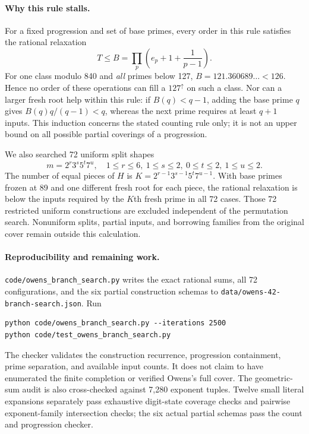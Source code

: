 \documentclass[11pt]{article}
\begin{document}
\paragraph{Why this rule stalls.}
For a fixed progression and set of base primes, every order in this rule
satisfies the rational relaxation
\[
 T\leq B=\prod_{p}\left(e_p+1+\frac1{p-1}\right).
\]
For one class modulo 840 and \emph{all} primes below 127,
$B=121.360689\ldots<126$. Hence no order of these operations can fill
a $127^\uparrow$ on such a class. Nor can a larger fresh root help within
this rule: if $B(q)<q-1$, adding the base prime $q$ gives
$B(q)q/(q-1)<q$, whereas the next prime requires at least $q+1$ inputs.
This induction concerns the stated counting rule only; it is not an upper
bound on all possible partial coverings of a progression.

We also searched 72 uniform split shapes
\[
 m=2^r3^s5^t7^u,\quad
 1\leq r\leq6,\ 1\leq s\leq2,\ 0\leq t\leq2,\ 1\leq u\leq2.
\]
The number of equal pieces of $H$ is
$K=2^{r-1}3^{s-1}5^t7^{u-1}$. With base primes frozen at 89 and one
different fresh root for each piece, the rational relaxation is below
the inputs required by the $K$th fresh prime in all 72 cases.
Those 72 restricted uniform constructions are excluded independent of
the permutation search. Nonuniform splits, partial inputs, and borrowing
families from the original cover remain outside this calculation.

\paragraph{Reproducibility and remaining work.}
\texttt{code/owens\_branch\_search.py} writes the exact rational sums,
all 72 configurations, and the six partial construction schemas to
\texttt{data/owens-42-branch-search.json}. Run
\begin{verbatim}
python code/owens_branch_search.py --iterations 2500
python code/test_owens_branch_search.py
\end{verbatim}
The checker validates the construction recurrence, progression containment,
prime separation, and available input counts. It does not claim to have
enumerated the finite completion or verified Owens's full cover. The
geometric-sum audit is also cross-checked against 7,280 exponent tuples.
Twelve small literal expansions separately pass exhaustive digit-state
coverage checks and pairwise exponent-family intersection checks; the
six actual partial schemas pass the count and progression checker.
\end{document}
